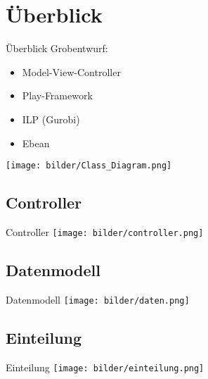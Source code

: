 \documentclass[18pt]{beamer}
\begin{document}
\section{Überblick}
\begin{frame}{Überblick}
Grobentwurf:
\begin{itemize}
  \item Model-View-Controller
  \item Play-Framework
  \item ILP (Gurobi) %
  \item Ebean
\end{itemize}
\end{frame}

\begin{frame}
\texttt{[image: bilder/Class\_Diagram.png]}
\end{frame}

\subsection{Controller}
\begin{frame}{Controller}
\texttt{[image: bilder/controller.png]}
\end{frame}

\subsection{Datenmodell}
\begin{frame}{Datenmodell}
\texttt{[image: bilder/daten.png]}
\end{frame}

\subsection{Einteilung}
\begin{frame}{Einteilung}
\texttt{[image: bilder/einteilung.png]}
\end{frame}
\end{document}
